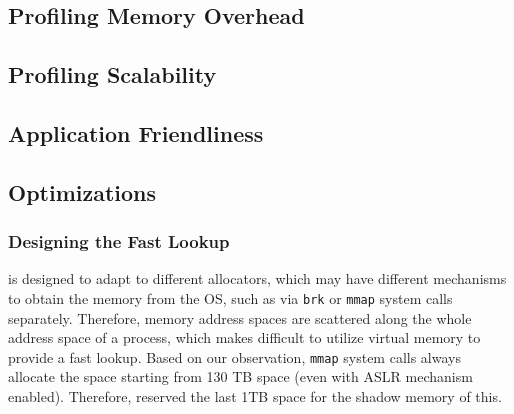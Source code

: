 \subsection{Profiling Memory Overhead}

\subsection{Profiling Scalability}

\subsection{Application Friendliness}

\subsection{Optimizations}

\subsubsection{Designing the Fast Lookup}

\label{sec:fastlookup}

\MP{} is designed to adapt to different allocators, which may have different mechanisms to obtain the memory from the OS, such as via \texttt{brk} or \texttt{mmap} system calls separately. Therefore, memory address spaces are scattered along the whole address space of a process, which makes difficult to utilize virtual memory to provide a fast lookup. Based on our observation, \texttt{mmap} system calls always allocate the space starting from 130 TB space (even with ASLR mechanism enabled). Therefore, \MP{} reserved the last 1TB space for the shadow memory of this.   
